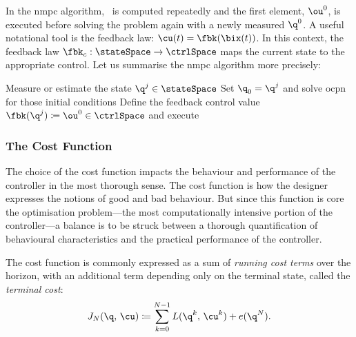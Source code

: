 In the \ac{nmpc} algorithm, \ou\ is computed repeatedly and the first element,
$\ou^0$, is executed before solving the problem again with a newly measured
$\q^0$. A useful notational tool is the feedback law: $\cu(t) = \fbk(\bix(t))$.
In this context, the feedback law $\fbk_c:\stateSpace\rightarrow\ctrlSpace$ maps
the current state to the appropriate control. Let us summarise the \ac{nmpc} algorithm more
precisely: \begin{displayAlgorithm}\label{alg:NMPC-general}\leavevmode%
%
  \begin{algorithmic}[1]
    \Repeat{}
    \State Measure or estimate the state $\q^j\in\stateSpace$
    \State Set $\q_0 = \q^j$ and solve \ac{ocpn} for those initial conditions
    \State Define the feedback control value $\fbk(\q^j) \coloneq \ou^0\in\ctrlSpace$ and execute
  \end{algorithmic}
\end{displayAlgorithm}



\subsubsection{The Cost Function}%


The choice of the cost function impacts the behaviour and performance of the
controller in the most thorough sense. The cost function is how the designer
expresses the notions of good and bad behaviour. But since this function is core
the optimisation problem---the most computationally intensive portion of the
controller---a balance is to be struck between a thorough quantification of
behavioural characteristics and the practical performance of the controller.

The cost function is commonly expressed as a sum of
\emph{running cost terms} over the horizon,
with an additional term depending only on the terminal state, called the
\emph{terminal cost}:
%
\begin{equation}\label{eq:costfn-aliased}
  J_N(\q,\, \cu) \coloneq \sum_{k=0}^{N-1} L(\q^k,\,\cu^k) + e(\q^N).
\end{equation}



